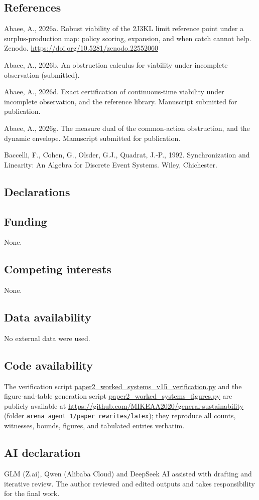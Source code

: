 \documentclass[10pt,twocolumn]{article}
\theoremstyle{definition}
\begin{document}
\subsection*{References}

Abaee, A., 2026a. Robust viability of the 2J3KL limit reference point
under a surplus-production map: policy scoring, expansion, and when
catch cannot help. Zenodo.
\url{https://doi.org/10.5281/zenodo.22552060}

Abaee, A., 2026b. An obstruction calculus for viability under
incomplete observation (submitted).

Abaee, A., 2026d. Exact certification of continuous-time viability under
incomplete observation, and the reference library. Manuscript submitted
for publication.

Abaee, A., 2026g. The measure dual of the common-action obstruction, and
the dynamic envelope. Manuscript submitted for publication.

Baccelli, F., Cohen, G., Olsder, G.J., Quadrat, J.-P., 1992.
Synchronization and Linearity: An Algebra for Discrete Event Systems.
Wiley, Chichester.

\subsection*{Declarations}

\subsection*{Funding}
None.

\subsection*{Competing interests}
None.

\subsection*{Data availability}
No external data were used.

\subsection*{Code availability}
The verification script \url{paper2_worked_systems_v15_verification.py}
and the figure-and-table generation script
\url{paper2_worked_systems_figures.py} are publicly available at
\url{https://github.com/MIKEAA2020/general-sustainability} (folder
\texttt{arena agent 1/paper rewrites/latex}); they reproduce all
counts, witnesses, bounds, figures, and tabulated entries verbatim.

\subsection*{AI declaration}
GLM (Z.ai), Qwen (Alibaba Cloud) and DeepSeek AI assisted with drafting
and iterative review. The author reviewed and edited outputs and takes
responsibility for the final work.
\end{document}
